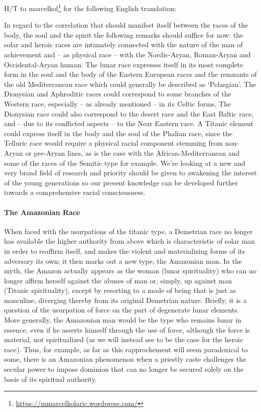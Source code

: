 \hfill

H/T to marcelkol\footnote{\url{https://mmarcelkolaric.wordpress.com/}} for the following English translation:

\begin{quotex}
In regard to the correlation that should manifest itself between the races of the body, the soul and the spirit the following remarks should suffice for now: the solar and heroic races are intimately connected with the nature of the man of achievement and – as physical race – with the Nordic-Aryan, Roman-Aryan and Occidental-Aryan human. The lunar race expresses itself in its most complete form in the soul and the body of the Eastern European races and the remnants of the old Mediterranean race which could generally be described as `Pelasgian'. The Dionysian and Aphroditic races could correspond to some branches of the Western race, especially – as already mentioned – in its Celtic forms. The Dionysian race could also correspond to the desert race and the East Baltic race, and – due to its conflicted aspects – to the Near Eastern race. A Titanic element could express itself in the body and the soul of the Phalian race, since the Telluric race would require a physical racial component stemming from non-Aryan or pre-Aryan lines, as is the case with the African-Mediterranean and some of the races of the Semitic type for example. We're looking at a new and very broad field of research and priority should be given to awakening the interest of the young generations so our present knowledge can be developed further towards a comprehensive racial consciousness. 

\end{quotex}

\hfill

\paragraph{The Amazonian Race}
When faced with the usurpations of the titanic type, a Demetrian race no longer has available the higher authority from above which is characteristic of solar man in order to reaffirm itself, and makes the violent and materializing forms of its adversary its own; it then marks out a new type, the Amazonian man. In the myth, the Amazon actually appears as the woman (lunar spirituality) who can no longer affirm herself against the abuses of man or, simply, up against man (Titanic spirituality), except by resorting to a mode of being that is just as masculine, diverging thereby from its original Demetrian nature. Briefly, it is a question of the usurpation of force on the part of degenerate lunar elements. More generally, the Amazonian man would be the type who remains lunar in essence, even if he asserts himself through the use of force, although the force is material, not spiritualized (as we will instead see to be the case for the heroic race). Thus, for example, as far as this rapprochement will seem paradoxical to some, there is an Amazonian phenomenon when a priestly caste challenges the secular power to impose dominion that can no longer be secured solely on the basis of its spiritual authority.

